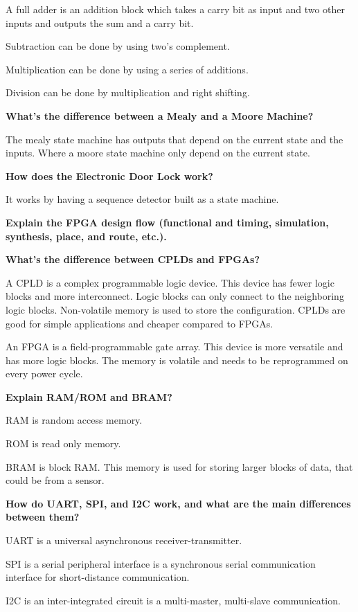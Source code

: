 A full adder is an addition block which takes a carry bit as input and
two other inputs and outputs the sum and a carry bit.

Subtraction can be done by using two's complement.

Multiplication can be done by using a series of additions.

Division can be done by multiplication and right shifting.


\textbf{What’s the difference between a Mealy and a Moore Machine?}

The mealy state machine has outputs that depend on the current state and the inputs.
Where a moore state machine only depend on the current state.

\textbf{How does the Electronic Door Lock work?}

It works by having a sequence detector built as a state machine.

\textbf{Explain the FPGA design flow (functional and timing, simulation, synthesis, place, and route, etc.).}




\textbf{What’s the difference between CPLDs and FPGAs?}

A CPLD is a complex programmable logic device.
This device has fewer logic blocks and more interconnect.
Logic blocks can only connect to the neighboring logic blocks.
Non-volatile memory is used to store the configuration.
CPLDs are good for simple applications and cheaper compared to FPGAs.

An FPGA is a field-programmable gate array.
This device is more versatile and has more logic blocks.
The memory is volatile and needs to be reprogrammed on every power cycle.




\textbf{Explain RAM/ROM and BRAM?}

RAM is random access memory.

ROM is read only memory.

BRAM is block RAM. This memory is used
for storing larger blocks of data, that could be from
a sensor.


\textbf{How do UART, SPI, and I2C work, and what are the main differences between them?}

UART is a universal asynchronous receiver-transmitter.

SPI is a serial peripheral interface is a synchronous serial communication
interface for short-distance communication.

I2C is an inter-integrated circuit is a multi-master, multi-slave communication.



